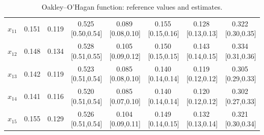 \documentclass[11pt,a4paper]{article}
\begin{document}
\begin{table}[H]
\begin{tabular}{@{}lccccccc@{}}
$x_{11}$ & 0.151 & 0.119 & 0.525\,{\scriptsize[0.50,0.54]} & 0.089\,{\scriptsize[0.08,0.10]} & 0.155\,{\scriptsize[0.15,0.16]} & 0.128\,{\scriptsize[0.13,0.13]} & 0.322\,{\scriptsize[0.30,0.35]} \\
$x_{12}$ & 0.148 & 0.134 & 0.528\,{\scriptsize[0.51,0.55]} & 0.105\,{\scriptsize[0.09,0.12]} & 0.150\,{\scriptsize[0.15,0.15]} & 0.143\,{\scriptsize[0.14,0.15]} & 0.334\,{\scriptsize[0.31,0.36]} \\
$x_{13}$ & 0.142 & 0.119 & 0.523\,{\scriptsize[0.51,0.54]} & 0.085\,{\scriptsize[0.08,0.10]} & 0.140\,{\scriptsize[0.14,0.14]} & 0.119\,{\scriptsize[0.12,0.12]} & 0.305\,{\scriptsize[0.29,0.33]} \\
$x_{14}$ & 0.141 & 0.116 & 0.520\,{\scriptsize[0.51,0.54]} & 0.085\,{\scriptsize[0.07,0.10]} & 0.140\,{\scriptsize[0.14,0.14]} & 0.120\,{\scriptsize[0.12,0.12]} & 0.302\,{\scriptsize[0.27,0.33]} \\
$x_{15}$ & 0.155 & 0.129 & 0.526\,{\scriptsize[0.51,0.54]} & 0.104\,{\scriptsize[0.09,0.11]} & 0.149\,{\scriptsize[0.14,0.15]} & 0.132\,{\scriptsize[0.13,0.14]} & 0.321\,{\scriptsize[0.30,0.34]} \\
\bottomrule\end{tabular}
\caption{Oakley--O'Hagan function: reference values and estimates.}
\label{tab:in4}
\end{table}
\end{document}
